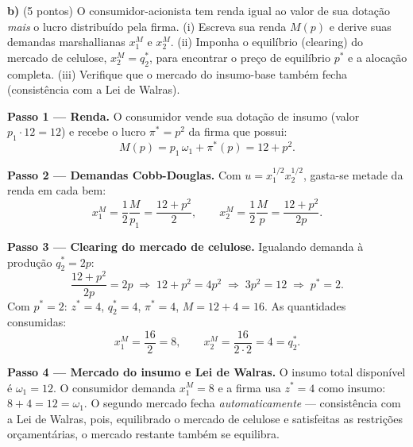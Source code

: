 \textbf{b)} (5 pontos) O consumidor-acionista tem renda igual ao valor de sua dotação \emph{mais} o lucro distribuído pela firma. (i) Escreva sua renda $M(p)$ e derive suas demandas marshallianas $x_1^{M}$ e $x_2^{M}$. (ii) Imponha o equilíbrio (clearing) do mercado de celulose, $x_2^{M}=q_2^{*}$, para encontrar o preço de equilíbrio $p^{*}$ e a alocação completa. (iii) Verifique que o mercado do insumo-base também fecha (consistência com a Lei de Walras).
\resolucaobox{7.2cm}
\begin{solucao}
\textbf{Passo 1 --- Renda.} O consumidor vende sua dotação de insumo (valor $p_1\cdot 12=12$) e recebe o lucro $\pi^{*}=p^{2}$ da firma que possui:
\[ M(p)=p_1\,\omega_1 + \pi^{*}(p) = 12 + p^{2}. \]

\textbf{Passo 2 --- Demandas Cobb-Douglas.} Com $u=x_1^{1/2}x_2^{1/2}$, gasta-se metade da renda em cada bem:
\[ x_1^{M}=\frac{1}{2}\frac{M}{p_1}=\frac{12+p^{2}}{2}, \qquad x_2^{M}=\frac{1}{2}\frac{M}{p}=\frac{12+p^{2}}{2p}. \]

\textbf{Passo 3 --- Clearing do mercado de celulose.} Igualando demanda à produção $q_2^{*}=2p$:
\[ \frac{12+p^{2}}{2p}=2p \;\Longrightarrow\; 12+p^{2}=4p^{2} \;\Longrightarrow\; 3p^{2}=12 \;\Longrightarrow\; p^{*}=2. \]
Com $p^{*}=2$: $z^{*}=4$, $q_2^{*}=4$, $\pi^{*}=4$, $M=12+4=16$. As quantidades consumidas:
\[ x_1^{M}=\frac{16}{2}=8, \qquad x_2^{M}=\frac{16}{2\cdot 2}=4=q_2^{*}. \]

\textbf{Passo 4 --- Mercado do insumo e Lei de Walras.} O insumo total disponível é $\omega_1=12$. O consumidor demanda $x_1^{M}=8$ e a firma usa $z^{*}=4$ como insumo: $8+4=12=\omega_1$. O segundo mercado fecha \emph{automaticamente} --- consistência com a Lei de Walras, pois, equilibrado o mercado de celulose e satisfeitas as restrições orçamentárias, o mercado restante também se equilibra.


\end{solucao}
